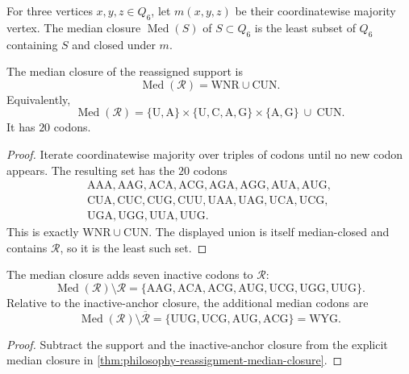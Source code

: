 \begin{definition}
\label{def:philosophy-median-closure}
For three vertices $x,y,z\in Q_{6}$, let $m(x,y,z)$ be their
coordinatewise majority vertex. The median closure $\operatorname{Med}(S)$
of $S\subset Q_{6}$ is the least subset of $Q_{6}$ containing $S$ and
closed under $m$.
\end{definition}

\begin{theorem}
\label{thm:philosophy-reassignment-median-closure}
The median closure of the reassigned support is
$$
  \operatorname{Med}(\mathcal{R})
  =
  \mathrm{WNR}\cup\mathrm{CUN}.
$$
Equivalently,
$$
  \operatorname{Med}(\mathcal{R})
  =
  \{\mathrm{U},\mathrm{A}\}\times
  \{\mathrm{U},\mathrm{C},\mathrm{A},\mathrm{G}\}\times
  \{\mathrm{A},\mathrm{G}\}
  \ \cup\
  \mathrm{CUN}.
$$
It has $20$ codons.
\end{theorem}
\begin{proof}
Iterate coordinatewise majority over triples of codons until no new
codon appears. The resulting set has the $20$ codons
$$
\begin{gathered}
  \mathrm{AAA},\mathrm{AAG},\mathrm{ACA},\mathrm{ACG},
  \mathrm{AGA},\mathrm{AGG},\mathrm{AUA},\mathrm{AUG},\\
  \mathrm{CUA},\mathrm{CUC},\mathrm{CUG},\mathrm{CUU},
  \mathrm{UAA},\mathrm{UAG},\mathrm{UCA},\mathrm{UCG},\\
  \mathrm{UGA},\mathrm{UGG},\mathrm{UUA},\mathrm{UUG}.
\end{gathered}
$$
This is exactly $\mathrm{WNR}\cup\mathrm{CUN}$. The displayed union is
itself median-closed and contains $\mathcal{R}$, so it is the least such
set.
\end{proof}


\begin{corollary}
\label{cor:philosophy-median-inactive-corners}
The median closure adds seven inactive codons to $\mathcal{R}$:
$$
  \operatorname{Med}(\mathcal{R})\setminus\mathcal{R}
  =
  \{\mathrm{AAG},\mathrm{ACA},\mathrm{ACG},\mathrm{AUG},
    \mathrm{UCG},\mathrm{UGG},\mathrm{UUG}\}.
$$
Relative to the inactive-anchor closure, the additional median codons
are
$$
  \operatorname{Med}(\mathcal{R})\setminus\overline{\mathcal{R}}
  =
  \{\mathrm{UUG},\mathrm{UCG},\mathrm{AUG},\mathrm{ACG}\}
  =
  \mathrm{WYG}.
$$
\end{corollary}
\begin{proof}
Subtract the support and the inactive-anchor closure from the explicit
median closure in
\autoref{thm:philosophy-reassignment-median-closure}.
\end{proof}

